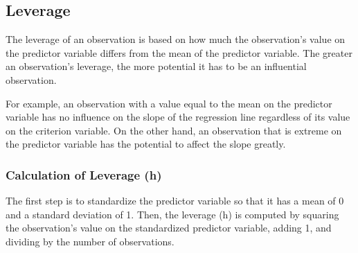 \subsection{Leverage}
The leverage of an observation is based on how much the observation's value on the predictor variable differs from the mean of the predictor variable. The greater an observation's leverage, the more potential it has to be an influential observation. 

For example, an observation with a value equal to the mean on the predictor variable has no influence on the slope of the regression line regardless of its value on the criterion variable. On the other hand, an observation that is extreme on the predictor variable has the potential to affect the slope greatly.

\subsubsection{Calculation of Leverage (h)}
The first step is to standardize the predictor variable so that it has a mean of 0 and a standard deviation of 1. Then, the leverage (h) is computed by squaring the observation's value on the standardized predictor variable, adding 1, and dividing by the number of observations.


